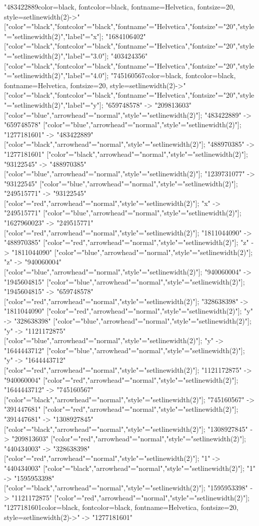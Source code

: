 "483422889{color=black, fontcolor=black, fontname=Helvetica, fontsize=20, style=setlinewidth(2)}->" ["color"="black","fontcolor"="black","fontname"="Helvetica","fontsize"="20","style"="setlinewidth(2)","label"="x"]; "1684106402" ["color"="black","fontcolor"="black","fontname"="Helvetica","fontsize"="20","style"="setlinewidth(2)","label"="3.0"]; "403424356" ["color"="black","fontcolor"="black","fontname"="Helvetica","fontsize"="20","style"="setlinewidth(2)","label"="4.0"]; "745160567{color=black, fontcolor=black, fontname=Helvetica, fontsize=20, style=setlinewidth(2)}->" ["color"="black","fontcolor"="black","fontname"="Helvetica","fontsize"="20","style"="setlinewidth(2)","label"="y"]; "659748578" -> "209813603" ["color"="blue","arrowhead"="normal","style"="setlinewidth(2)"]; "483422889" -> "659748578" ["color"="blue","arrowhead"="normal","style"="setlinewidth(2)"]; "1277181601" -> "483422889" ["color"="black","arrowhead"="normal","style"="setlinewidth(2)"]; "488970385" -> "1277181601" ["color"="black","arrowhead"="normal","style"="setlinewidth(2)"]; "93122545" -> "488970385" ["color"="blue","arrowhead"="normal","style"="setlinewidth(2)"]; "1239731077" -> "93122545" ["color"="blue","arrowhead"="normal","style"="setlinewidth(2)"]; "249515771" -> "93122545" ["color"="red","arrowhead"="normal","style"="setlinewidth(2)"]; "x" -> "249515771" ["color"="blue","arrowhead"="normal","style"="setlinewidth(2)"]; "1627960023" -> "249515771" ["color"="red","arrowhead"="normal","style"="setlinewidth(2)"]; "1811044090" -> "488970385" ["color"="red","arrowhead"="normal","style"="setlinewidth(2)"]; "z" -> "1811044090" ["color"="blue","arrowhead"="normal","style"="setlinewidth(2)"]; "z" -> "940060004" ["color"="blue","arrowhead"="normal","style"="setlinewidth(2)"]; "940060004" -> "1945604815" ["color"="blue","arrowhead"="normal","style"="setlinewidth(2)"]; "1945604815" -> "659748578" ["color"="red","arrowhead"="normal","style"="setlinewidth(2)"]; "328638398" -> "1811044090" ["color"="red","arrowhead"="normal","style"="setlinewidth(2)"]; "y" -> "328638398" ["color"="blue","arrowhead"="normal","style"="setlinewidth(2)"]; "y" -> "1121172875" ["color"="blue","arrowhead"="normal","style"="setlinewidth(2)"]; "y" -> "1644443712" ["color"="blue","arrowhead"="normal","style"="setlinewidth(2)"]; "y" -> "1644443712" ["color"="red","arrowhead"="normal","style"="setlinewidth(2)"]; "1121172875" -> "940060004" ["color"="red","arrowhead"="normal","style"="setlinewidth(2)"]; "1644443712" -> "745160567" ["color"="black","arrowhead"="normal","style"="setlinewidth(2)"]; "745160567" -> "391447681" ["color"="red","arrowhead"="normal","style"="setlinewidth(2)"]; "391447681" -> "1308927845" ["color"="black","arrowhead"="normal","style"="setlinewidth(2)"]; "1308927845" -> "209813603" ["color"="red","arrowhead"="normal","style"="setlinewidth(2)"]; "440434003" -> "328638398" ["color"="red","arrowhead"="normal","style"="setlinewidth(2)"]; "1" -> "440434003" ["color"="black","arrowhead"="normal","style"="setlinewidth(2)"]; "1" -> "1595953398" ["color"="black","arrowhead"="normal","style"="setlinewidth(2)"]; "1595953398" -> "1121172875" ["color"="red","arrowhead"="normal","style"="setlinewidth(2)"]; "1277181601{color=black, fontcolor=black, fontname=Helvetica, fontsize=20, style=setlinewidth(2)}->" -> "1277181601" 